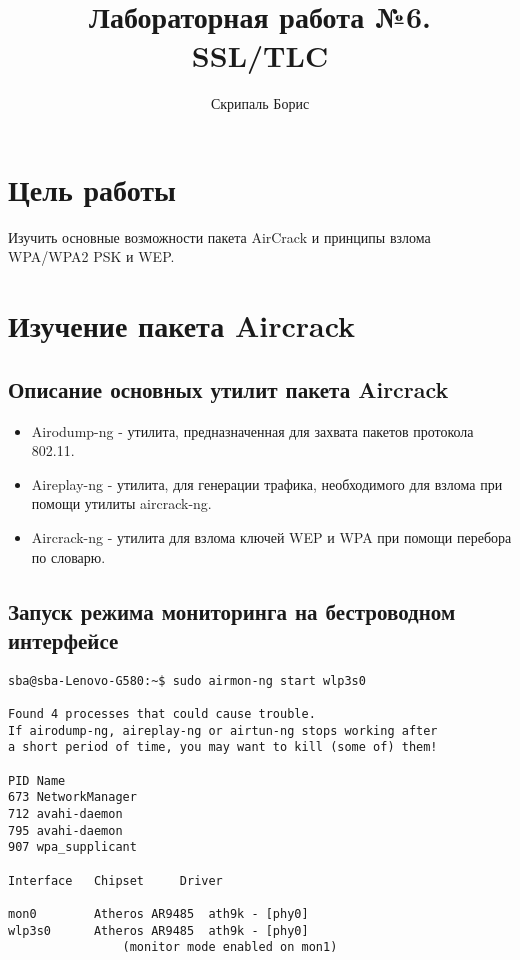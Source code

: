 \documentclass[10pt,a4paper]{report}
\author{Скрипаль Борис}
\title{Лабораторная работа №6.\\
	SSL/TLC}
\begin{document}
	\maketitle
	\renewcommand{\thesection}{\arabic{section}}
	\tableofcontents
	\pagebreak
	
	\setcounter{totalnumber}{10}
	\setcounter{topnumber}{10}
	\setcounter{bottomnumber}{10}
	\renewcommand{\topfraction}{1}
	\renewcommand{\textfraction}{0}
	
	\section{Цель работы}
		Изучить основные возможности пакета AirCrack и принципы взлома WPA/WPA2 PSK и WEP.
	\section{Изучение пакета Aircrack}
		\subsection{Описание основных утилит пакета Aircrack}
			\begin{itemize}
				\item Airodump-ng - утилита, предназначенная для захвата пакетов протокола 802.11.
				\item Aireplay-ng - утилита, для генерации трафика, необходимого для взлома при помощи утилиты aircrack-ng.
				\item Aircrack-ng - утилита для взлома ключей WEP и WPA при помощи перебора по словарю.
			\end{itemize}
		\subsection{Запуск режима мониторинга на бестроводном интерфейсе}
			\begin{lstlisting}
sba@sba-Lenovo-G580:~$ sudo airmon-ng start wlp3s0

Found 4 processes that could cause trouble.
If airodump-ng, aireplay-ng or airtun-ng stops working after
a short period of time, you may want to kill (some of) them!

PID	Name
673	NetworkManager
712	avahi-daemon
795	avahi-daemon
907	wpa_supplicant

Interface	Chipset		Driver

mon0		Atheros AR9485	ath9k - [phy0]
wlp3s0		Atheros AR9485	ath9k - [phy0]
				(monitor mode enabled on mon1)
			\end{lstlisting}
\end{document}
